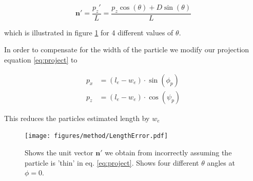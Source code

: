 \begin{equation}
\mathbf{n}' = \frac{p_z'}{L} = \frac{p_z\cos(\theta)  + D\sin(\theta)}{L} 
\end{equation}

which is illustrated in figure \ref{fig:lengtherror} for 4 different values of $\theta$. 

In order to compensate for the width of the particle we modify our projection equation \ref{eq:project} to

\begin{align}\label{eq:widthCompensation}
p_x  &= (l_e - w_e)\cdot \sin(\phi_p) \\
p_z  &= (l_e - w_e)\cdot \cos(\psi_p) 
\end{align}


This reduces the particles estimated length by $w_e$
\begin{figure}[H]
\centering
\texttt{[image: figures/method/LengthError.pdf]}
\caption{Shows the unit vector $\mathbf{n}'$ we obtain from incorrectly assuming the particle is 'thin' in eq. \ref{eq:project}. Shows four different $\theta$ angles at $\phi=0$.}\label{fig:lengtherror}
\end{figure} 

